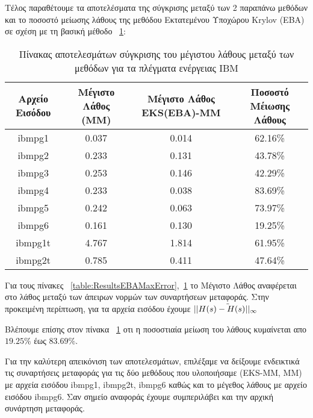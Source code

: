 Τέλος παραθέτουμε τα αποτελέσματα της σύγκρισης μεταξύ των 2 παραπάνω μεθόδων και το ποσοστό μείωσης λάθους της μεθόδου Εκτατεμένου Υποχώρου \textlatin{Krylov} (\textlatin{EBA}) σε σχέση με τη βασική μέθοδο ~\ref{table:ResultsEBAMaxErrorCompared}:

\begin{table}[h!]
\centering
 \begin{tabular}{||c | c | c | c||} 
 \hline
 Αρχείο Εισόδου & Μέγιστο Λάθος (\textlatin{MM}) & Μέγιστο Λάθος \textlatin{EKS(EBA)-MM} & Ποσοστό Μέιωσης Λάθους \\ [0.5ex] 
 \hline\hline
 \textlatin{ibmpg1} & 0.037  & 0.014 & 62.16\% \\ 
 \hline
 \textlatin{ibmpg2} & 0.233 & 0.131 & 43.78\% \\
 \hline
 \textlatin{ibmpg3} & 0.253 & 0.146 & 42.29\% \\
 \hline
 \textlatin{ibmpg4} & 0.233 & 0.038 & 83.69\% \\
 \hline
 \textlatin{ibmpg5} & 0.242 & 0.063 & 73.97\% \\
 \hline
 \textlatin{ibmpg6} & 0.161 & 0.130 & 19.25\% \\
 \hline
 \textlatin{ibmpg1t} & 4.767 &  1.814 & 61.95\% \\
 \hline
 \textlatin{ibmpg2t} & 0.785 &  0.411 & 47.64\% \\
 \hline
\end{tabular}
\caption{Πίνακας αποτελεσμάτων σύγκρισης του μέγιστου λάθους μεταξύ των μεθόδων για τα πλέγματα ενέργειας \textlatin{IBM}}
\label{table:ResultsEBAMaxErrorCompared}
\end{table}

Για τους πίνακες ~\ref{table:ResultsEBAMaxError},~\ref{table:ResultsEBAMaxErrorCompared} το Μέγιστο Λάθος αναφέρεται στο λάθος μεταξύ των άπειρων νορμών των συναρτήσεων μεταφοράς. Στην προκειμένη περίπτωση, για τα αρχεία εισόδου έχουμε $|| \Tilde{H(s) - H(s)||_\infty}$


Βλέπουμε επίσης στον πίνακα ~\ref{table:ResultsEBAMaxErrorCompared} οτι η ποσοστιαία μείωση του λάθους κυμαίνεται απο $19.25\%$ έως $83.69\%$.

Για την καλύτερη απεικόνιση των αποτελεσμάτων, επιλέξαμε να δείξουμε ενδεικτικά τις συναρτήσεις μεταφοράς για τις δύο μεθόδους που υλοποιήσαμε (\textlatin{EKS-MM, MM}) με αρχεία εισόδου \textlatin{ibmpg1, ibmpg2t, ibmpg6} καθώς και το μέγεθος λάθους με αρχείο εισόδου \textlatin{ibmpg6}. Σαν σημείο αναφοράς έχουμε συμπεριλάβει και την αρχική συνάρτηση μεταφοράς.


